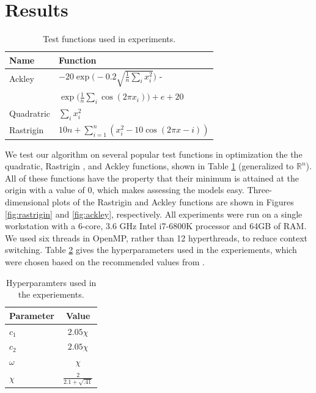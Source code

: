 \section{Results}\label{sec:results}
\begin{table}
  \centering
  \caption{Test functions used in experiments.}\label{tab:functions}
  \begin{tabular}{ll}\toprule
    \textbf{Name} & \textbf{Function}\\\midrule
    Ackley & $-20\exp\Big(-0.2\sqrt{\frac{1}{n}\sum_ix_i^2}\Big)$ -\\
    & \hspace{5mm} $\exp\Big(\frac{1}{n}\sum_i\cos(2\pi x_i)\Big) + e + 20$\\
    Quadratric & $\sum_i x_i^2$\\
    Rastrigin & $10n + \sum_{i=1}^n(x_i^2 - 10\cos(2\pi x - i))$\\\bottomrule
  \end{tabular}
\end{table}
We test our algorithm on several popular test functions in optimization
\cite{testprobs} the the quadratic, Rastrigin
\cite{rastrigin}, and Ackley \cite{ackley} functions, shown in Table
\ref{tab:functions} (generalized to $\mathbb{R}^n$). All of these functions have
the property that their minimum is attained at the origin with a value of
$0$, which makes assessing the models easy. Three-dimensional plots of the
Rastrigin and Ackley functions are shown in Figures \ref{fig:rastrigin} and
\ref{fig:ackley}, respectively.
All experiments were run on a single
workstation with a 6-core, 3.6 GHz Intel i7-6800K processor and 64GB of RAM. We
used six threads in OpenMP, rather than 12 hyperthreads, to reduce context switching.
Table \ref{tab:param}
gives the hyperparameters used in the experiements, which were chosen based on
the recommended values from \cite{pso-convergence, spso}.

\begin{table}
  \centering
  \caption{Hyperparamters used in the experiements.}\label{tab:param}
  \begin{tabular}{lc}\toprule
    \textbf{Parameter} & \textbf{Value}\\\midrule
    $c_1$ & $2.05 \chi$\\
    $c_2$ & $2.05 \chi$\\
    $\omega$ & $\chi$\\
    $\chi$ & $\frac{2}{2.1 + \sqrt{.41}}$\\\bottomrule
    \end{tabular}
\end{table}

